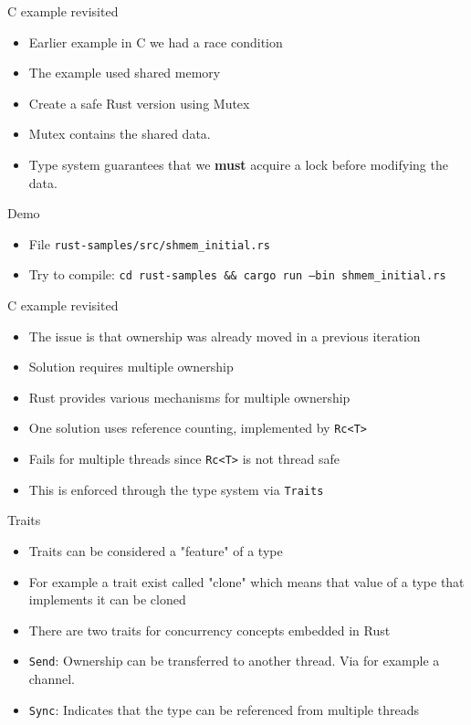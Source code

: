 \documentclass{beamer}
\begin{document}
\begin{frame}{C example revisited}
    \begin{itemize}
        \item Earlier example in C we had a race condition
        \item The example used shared memory
        \item Create a safe Rust version using Mutex
        \item Mutex contains the shared data.
        \item Type system guarantees that we \textbf{must} acquire a lock before modifying the data.
    \end{itemize}
\end{frame}

\begin{frame}{Demo}
    \begin{itemize}
    \item File \texttt{rust-samples/src/shmem\_initial.rs}
    \item Try to compile: \texttt{cd rust-samples \&\& cargo run --bin shmem\_initial.rs}
    \end{itemize}
\end{frame}

\begin{frame}{C example revisited}
    \begin{itemize}
        \item The issue is that ownership was already moved in a previous iteration
        \item Solution requires multiple ownership
        \item Rust provides various mechanisms for multiple ownership
        \item One solution uses reference counting, implemented by \texttt{Rc<T>}
        \item Fails for multiple threads since \texttt{Rc<T>} is not thread safe
        \item This is enforced through the type system via \texttt{Traits}
    \end{itemize}
\end{frame}

\begin{frame}{Traits}
    \begin{itemize}
        \item Traits can be considered a "feature" of a type
        \item For example a trait exist called "clone" which means that value of a type that implements it can be cloned
        \item There are two traits for concurrency concepts embedded in Rust
        \item \texttt{Send}: Ownership can be transferred to another thread. Via for example a channel.
        \item \texttt{Sync}: Indicates that the type can be referenced from multiple threads
    \end{itemize}
\end{frame}
\end{document}

